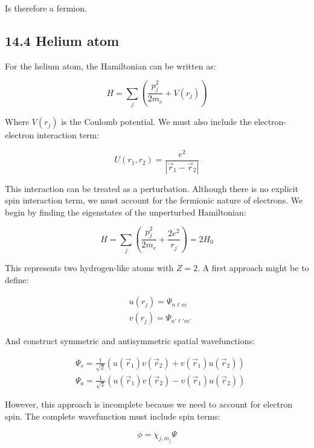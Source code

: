 \documentclass[italian]{HKNdocument}
\begin{document}
Is therefore a fermion.

\subsection*{14.4 Helium atom}
For the helium atom, the Hamiltonian can be written as:

\begin{equation*}
H=\sum_j(\frac{p_j^2}{2m_e}+V(r_j)) \tag{14.31}
\end{equation*}

Where $V(r_j)$ is the Coulomb potential. We must also include the electron-electron interaction term:

\begin{equation*}
U(r_1,r_2)=\frac{e^2}{|\vec{r}_1-\vec{r}_2|} \tag{14.32}
\end{equation*}

This interaction can be treated as a perturbation. Although there is no explicit spin interaction term, we must account for the fermionic nature of electrons. We begin by finding the eigenstates of the unperturbed Hamiltonian:

\begin{equation*}
H=\sum_j(\frac{p_j^2}{2m_e}+\frac{2e^2}{r_j})=2H_0 \tag{14.33}
\end{equation*}

This represents two hydrogen-like atoms with $Z=2$. A first approach might be to define:

\begin{align*}
&u(r_j)=\Psi_{n\ell m} \tag{14.34}\\
&v(r_j)=\Psi_{n'\ell'm'}
\end{align*}

And construct symmetric and antisymmetric spatial wavefunctions:

\begin{align*}
&\Psi_s=\frac{1}{\sqrt{2}}(u(\vec{r}_1)v(\vec{r}_2)+v(\vec{r}_1)u(\vec{r}_2)) \tag{14.35}\\
&\Psi_a=\frac{1}{\sqrt{2}}(u(\vec{r}_1)v(\vec{r}_2)-v(\vec{r}_1)u(\vec{r}_2))
\end{align*}

However, this approach is incomplete because we need to account for electron spin. The complete wavefunction must include spin terms:

\begin{equation*}
\phi=\chi_{j,m_j}\Psi \tag{14.36}
\end{equation*}
\end{document}
